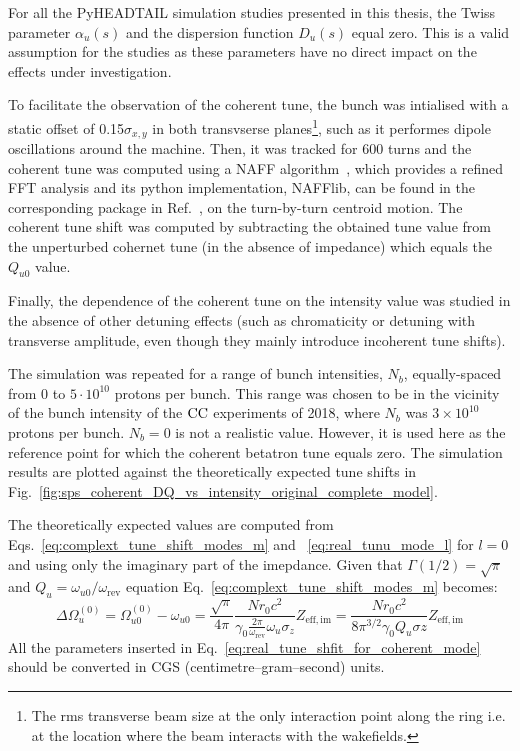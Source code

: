 For all the PyHEADTAIL simulation studies presented in this thesis, the Twiss parameter $\alpha_u(s)$ and the dispersion function $D_u(s)$ equal zero. This is a valid assumption for the studies as these parameters have no direct impact on the effects under investigation.

To facilitate the observation of the coherent tune, the bunch was intialised with a static offset of 0.15$\sigma_{x,y}$ in both transvserse planes\footnote{The rms transverse beam size at the only interaction point along the ring i.e. at the location where the beam interacts with the wakefields.}, such as it performes dipole oscillations around the machine. Then, it was tracked for 600 turns and the coherent tune was computed using a NAFF algorithm~\cite{LASKAR1990266, Kostoglou:2289645}, which provides a refined FFT analysis and its python implementation, NAFFlib, can be found in the corresponding package in Ref.~\cite{nafflib_repository}, on the turn-by-turn centroid motion. The coherent tune shift was computed by subtracting the obtained tune value from the unperturbed cohernet tune (in the absence of impedance) which equals the $Q_{u0}$ value.

Finally, the dependence of the coherent tune on the intensity value was studied in the absence of other detuning effects (such as chromaticity or detuning with transverse amplitude, even though they mainly introduce incoherent tune shifts). %

The simulation was repeated for a range of bunch intensities, $N_b$, equally-spaced from 0 to $5 \cdot 10^{10}$ protons per bunch. This range was chosen to be in the vicinity of the bunch intensity of the ${\mathrm{CC}}$ experiments of 2018, where $N_b$ was $3\times 10^{10}$ protons per bunch. $N_b=0$ is not a realistic value. However, it is used here as the reference point for which the coherent betatron tune equals zero. The simulation results are plotted against the theoretically expected tune shifts in Fig.~\ref{fig:sps_coherent_DQ_vs_intensity_original_complete_model}.

The theoretically expected values are computed from Eqs.~\eqref{eq:complext_tune_shift_modes_m} and ~\eqref{eq:real_tunu_mode_l} for $l=0$ and using only the imaginary part of the imepdance. Given that $\Gamma(1/2)=\sqrt{\pi}$ and $Q_u = \omega_{u0}/\omega_\mathrm{rev}$ equation Eq.~\eqref{eq:complext_tune_shift_modes_m} becomes:
\begin{equation}\label{eq:real_tune_shfit_for_coherent_mode}
    \Delta \Omega_u^{(0)} =  \Omega_{u0}^{(0)} - \omega_{u0} = \frac{\sqrt{\pi}}{4 \pi}\frac{N r_0 c^2}{\gamma_0 \frac{2\pi}{\omega_\mathrm{rev}}\omega_u \sigma_z} Z_\mathrm{eff, im} = \frac{N r_0 c^2}{8 \pi^{3/2} \gamma_0 Q_u \sigma z}Z_\mathrm{eff, im}
\end{equation}
All the parameters inserted in Eq.~\eqref{eq:real_tune_shfit_for_coherent_mode} should be converted in CGS (centimetre–gram–second) units.

